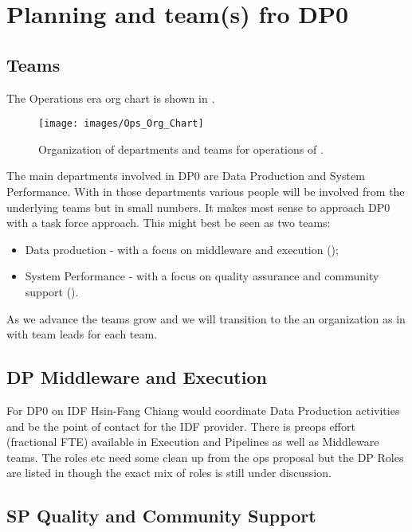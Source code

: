 \section{Planning and team(s) fro DP0} \label{sec:plan}


\subsection {Teams}

The Operations era org chart is shown in .


\begin{figure}
\begin{center}
\texttt{[image: images/Ops\_Org\_Chart]}
\end{center}
\caption{ Organization of departments and teams  for operations of \RO. \label{fig:org}}
\end{figure}

The main departments involved in DP0 are Data Production and System Performance. With in those departments various people will be involved from the underlying teams but in small numbers. It makes most sense to approach DP0 with a task force approach. This might best be seen as two teams:

\begin{itemize}
\item Data production - with a focus on middleware and execution ();
\item System Performance - with a focus on quality assurance and community support ().
\end{itemize}

As we advance the teams grow and we will transition to the an organization as in 
with team leads for each team.

\subsection{DP Middleware and Execution}\label{sec:dp}
For DP0 on IDF Hsin-Fang Chiang would coordinate Data Production activities and be the point
of contact for the IDF provider.
There is preops effort (fractional FTE) available in Execution and Pipelines as well as Middleware teams.
The roles etc need some clean up from the ops proposal but the DP Roles are listed in  though the exact mix of roles is still under discussion.


\subsection{SP Quality  and Community Support} \label{sec:sp}

